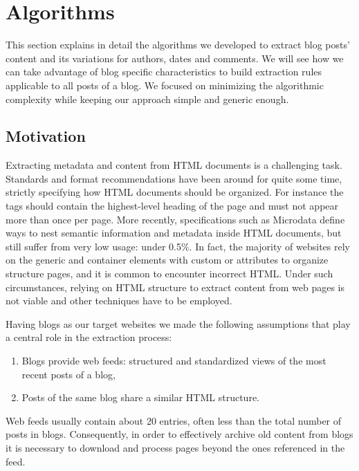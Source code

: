 \section{Algorithms}

This section explains in detail the algorithms we developed to extract blog posts' content and its variations for authors, dates and comments. We will see how we can take advantage of blog specific characteristics to build extraction rules applicable to all posts of a blog. We focused on minimizing the algorithmic complexity while keeping our approach simple and generic enough.

\subsection{Motivation}
Extracting metadata and content from HTML documents is a challenging task. Standards and format recommendations have been around for quite some time, strictly specifying how HTML documents should be organized. For instance the  tags should contain the highest-level heading of the page and must not appear more than once per page\cite{w3c2002}. More recently, specifications such as Microdata\cite{whatwg2013} define ways to nest semantic information and metadata inside HTML documents, but still suffer from very low usage: under 0.5\%\cite{andrewrogers2013}. In fact, the majority of websites rely on the generic  and  container elements with custom  or  attributes to organize structure pages, and it is common to encounter incorrect HTML. Under such circumstances, relying on HTML structure to extract content from web pages is not viable and other techniques have to be employed.


Having blogs as our target websites we made the following assumptions that play a central role in the extraction process:
\begin{enumerate}[label={(\arabic*)}]
  \item\label{havefeedAssum} Blogs provide web feeds: structured and standardized views of the most recent posts of a blog,
  \item\label{similarhtmlAssum} Posts of the same blog share a similar HTML structure.
\end{enumerate}
Web feeds usually contain about 20 entries\cite{oita2010}, often less than the total number of posts in blogs. Consequently, in order to effectively archive old content from blogs it is necessary to download and process pages beyond the ones referenced in the feed.

